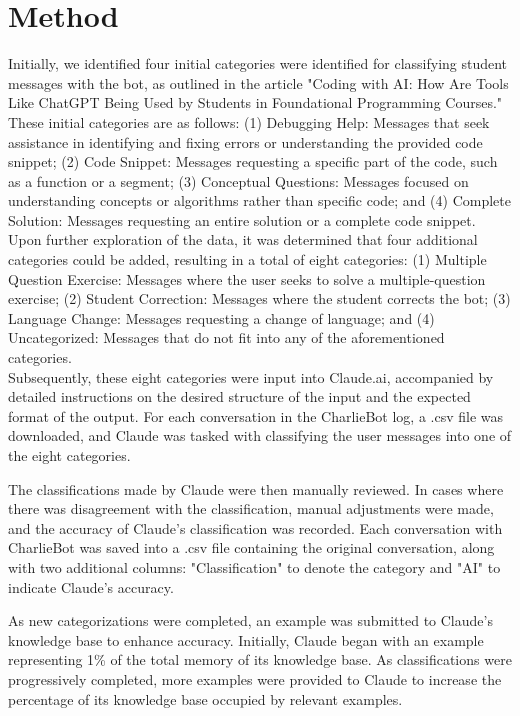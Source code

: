 \documentclass[conference]{IEEEtran}
\begin{document}
\section{Method}

Initially, we identified four initial categories were identified for classifying
student messages with the bot, as outlined in the article "Coding with AI: How
Are Tools Like ChatGPT Being Used by Students in Foundational Programming
Courses." These initial categories are as follows: (1) Debugging Help: Messages
that seek assistance in identifying and fixing errors or understanding the
provided code snippet; (2) Code Snippet: Messages requesting a specific part
of the code, such as a function or a segment; (3) Conceptual Questions: Messages
focused on understanding concepts or algorithms rather than specific code;
and (4) Complete Solution: Messages requesting an entire solution or a complete
code snippet.
\\
Upon further exploration of the data, it was determined that four additional
categories could be added, resulting in a total of eight categories: (1)
Multiple Question Exercise: Messages where the user seeks to solve a multiple-question
exercise; (2) Student Correction: Messages where the student corrects the bot;
(3) Language Change: Messages requesting a change of language; and (4)
Uncategorized: Messages that do not fit into any of the aforementioned
categories.
\\
Subsequently, these eight categories were input into Claude.ai, accompanied by
detailed instructions on the desired structure of the input and the expected
format of the output. For each conversation in the CharlieBot log, a .csv file
was downloaded, and Claude was tasked with classifying the user messages into
one of the eight categories.

The classifications made by Claude were then manually reviewed. In cases where
there was disagreement with the classification, manual adjustments were made,
and the accuracy of Claude's classification was recorded. Each conversation
with CharlieBot was saved into a .csv file containing the original conversation,
along with two additional columns: "Classification" to denote the category and
"AI" to indicate Claude's accuracy.

As new categorizations were completed, an example was submitted to Claude's
knowledge base to enhance accuracy. Initially, Claude began with an example
representing 1\% of the total memory of its knowledge base. As classifications
were progressively completed, more examples were provided to Claude to increase
the percentage of its knowledge base occupied by relevant examples.
\end{document}
